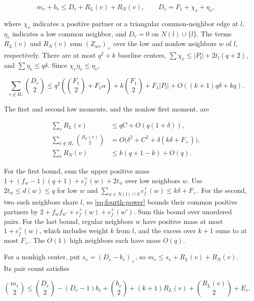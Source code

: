 \documentclass[11pt,reqno]{amsart}
\theoremstyle{definition}
\theoremstyle{remark}
\numberwithin{equation}{section}
\begin{document}
\begin{equation}\label{eq:block}
m_v+b_v\le D_v+R_L(v)+R_N(v),
\qquad D_v=F_1+\chi_v+\eta_v,
\end{equation}

where \(\chi_v\) indicates a positive partner or a triangular common-neighbor edge at \(l\), \(\eta_v\) indicates a low common neighbor, and \(D_v=0\) on \(N(l)\cup\{l\}\). The terms \(R_L(v)\) and \(R_N(v)\) sum \((Z_{wv})_+\) over the low and nonlow neighbors \(w\) of \(l\), respectively. There are at most \(q^2+k\) baseline centers, \(\sum\chi_v\le |P_l|+2t_l(q+2)\), and \(\sum\eta_v\le q\delta\). Since \(\chi_v\eta_v\le\eta_v\),

\begin{equation}\label{eq:baseline}
\sum_{v\notin H_*}\binom{D_v}{2}\le
q^2\left(\binom{F_1}2+F_1\alpha\right)
+k\binom{F_1}2+F_1|P_l|+O((k+1)q\delta+kq).
\end{equation}

The first and second low moments, and the nonlow first moment, are

\begin{equation}\label{eq:moments}
\begin{aligned}
\sum_v R_L(v)&\le qC+O(q(1+\delta)),\\
\sum_{v\notin H_*}\binom{R_L(v)}2
&=O\bigl(\delta^2+C^2+\delta(k\delta+F_+)\bigr),\\
\sum_v R_N(v)&\le k(q+1-k)+O(q).
\end{aligned}
\end{equation}

For the first bound, sum the upper positive mass \(1+(f_w-1)(q+1)+c_f^+(w)+2t_w\) over low neighbors \(w\). Use \(2t_w\le d(w)\le q\) for low \(w\) and \(\sum_{w\in N(l)\cap S}c_f^+(w)\le k\delta+F_+\). For the second, two such neighbors share \(l\), so \eqref{eq:fourth-power} bounds their common positive partners by \(2+f_w f_{w'}+c_f^+(w)+c_f^+(w')\). Sum this bound over unordered pairs. For the last bound, regular neighbors \(w\) have positive mass at most \(1+c_f^+(w)\), which includes weight \(k\) from \(l\), and the excess over \(k+1\) sums to at most \(F_+\). The \(O(1)\) high neighbors each have mass \(O(q)\).

For a nonhigh center, put \(s_v=(D_v-b_v)_+\), so \(m_v\le s_v+R_L(v)+R_N(v)\). Its pair count satisfies

\begin{equation}\label{eq:pair-bound}
\binom{m_v}2\le \binom{D_v}2-(D_v-1)b_v+\binom{b_v}2
+(k+1)R_L(v)+\binom{R_L(v)}2+E_v.
\end{equation}
\end{document}
